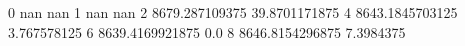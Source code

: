0 nan nan
1 nan nan
2 8679.287109375 39.8701171875
4 8643.1845703125 3.767578125
6 8639.4169921875 0.0
8 8646.8154296875 7.3984375

